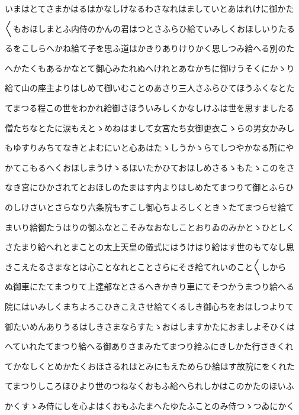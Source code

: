 \documentclass[a4paper,11pt,landscape]{ltjtarticle}
\begin{document}
いまはとてさまかはるはかなしけなるわさなれはましていとあはれけに御かた
\par\medskip
〱もおほしまとふ内侍のかんの君はつとさふらひ給ていみしくおほしいりたる
\par\medskip
るをこしらへかね給て子を思ふ道はかきりありけりかく思しつみ給へる別のた
\par\medskip
へかたくもあるかなとて御心みたれぬへけれとあなかちに御けうそくにかゝり
\par\medskip
給て山の座主よりはしめて御いむことのあさり三人さふらひてほうふくなとた
\par\medskip
てまつる程この世をわかれ給御さほういみしくかなしけふは世を思すましたる
\par\medskip
僧たちなとたに涙もえとゝめねはまして女宮たち女御更衣こゝらの男女かみし
\par\medskip
もゆすりみちてなきとよむにいと心あはたゝしうかゝらてしつやかなる所にや
\par\medskip
かてこもるへくおほしまうけゝるほいたかひておほしめさるゝもたゝこのをさ
\par\medskip
なき宮にひかされてとおほしのたまはす内よりはしめたてまつりて御とふらひ
\par\medskip
のしけさいとさらなり六条院もすこし御心ちよろしくときゝたてまつらせ給て
\par\medskip
まいり給御たうはりの御ふなとこそみなおなしことおりゐのみかとゝひとしく
\par\medskip
さたまり給へれとまことの太上天皇の儀式にはうけはり給はす世のもてなし思
\par\medskip
きこえたるさまなとは心ことなれとことさらにそき給てれいのこと〱しから
\par\medskip
ぬ御車にたてまつりて上達部なとさるへきかきり車にてそつかうまつり給へる
\par\medskip
院にはいみしくまちよろこひきこえさせ給てくるしき御心ちをおほしつよりて
\par\medskip
御たいめんありうるはしきさまならすたゝおはしますかたにおましよそひくは
\par\medskip
へていれたてまつり給へる御ありさまみたてまつり給ふにきしかた行さきくれ
\par\medskip
てかなしくとめかたくおほさるれはとみにもえためらひ給はす故院にをくれた
\par\medskip
てまつりしころほひより世のつねなくおもふ給へられしかはこのかたのほいふ
\par\medskip
かくすゝみ侍にしを心よはくおもふたまへたゆたふことのみ侍つゝつゐにかく
\par\medskip
\end{document}
